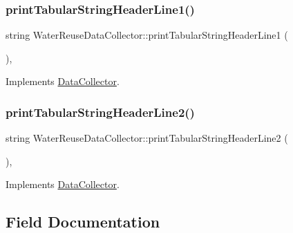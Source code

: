\subsubsection{\texorpdfstring{print\+Tabular\+String\+Header\+Line1()}{printTabularStringHeaderLine1()}}
{\footnotesize\ttfamily string Water\+Reuse\+Data\+Collector\+::print\+Tabular\+String\+Header\+Line1 (\begin{DoxyParamCaption}{ }\end{DoxyParamCaption})\hspace{0.3cm}{\ttfamily [override]}, {\ttfamily [virtual]}}



Implements \mbox{\hyperlink{classDataCollector_a91619cfa9e9b8cefd2f7c20d5718b41e_a91619cfa9e9b8cefd2f7c20d5718b41e}{Data\+Collector}}.

\mbox{\label{classWaterReuseDataCollector_a8cead3771efabeb62dcf069008810f43_a8cead3771efabeb62dcf069008810f43}} 
\subsubsection{\texorpdfstring{print\+Tabular\+String\+Header\+Line2()}{printTabularStringHeaderLine2()}}
{\footnotesize\ttfamily string Water\+Reuse\+Data\+Collector\+::print\+Tabular\+String\+Header\+Line2 (\begin{DoxyParamCaption}{ }\end{DoxyParamCaption})\hspace{0.3cm}{\ttfamily [override]}, {\ttfamily [virtual]}}



Implements \mbox{\hyperlink{classDataCollector_af01ea961314be2164f39e6d4cd59e443_af01ea961314be2164f39e6d4cd59e443}{Data\+Collector}}.



\subsection{Field Documentation}
\mbox{\label{classWaterReuseDataCollector_a9c119c103524f7350d771406a4a8c6a9_a9c119c103524f7350d771406a4a8c6a9}} 
